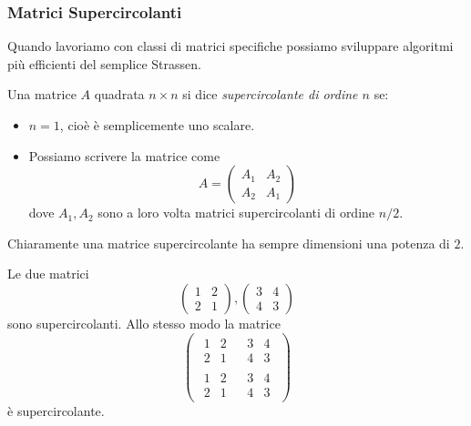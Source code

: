 \documentclass[11pt]{scrartcl}
\begin{document}
	\newpage
	
	\subsubsection{Matrici Supercircolanti}
	Quando lavoriamo con classi di matrici specifiche possiamo sviluppare algoritmi più efficienti del semplice Strassen.
	\begin{definition}
		Una matrice $A$ quadrata $n\times n$ si dice \textit{supercircolante di ordine $n$} se:
		\begin{itemize}
			\item $n=1$, cioè è semplicemente uno scalare.
			\item Possiamo scrivere la matrice come
			$$A=\left(
			\begin{array}{c|c}
				A_1 & A_2 \\
				\hline
				A_2 & A_1
			\end{array}
			\right)$$
			dove $A_1,A_2$ sono a loro volta matrici supercircolanti di ordine $n/2$.
		\end{itemize}
		Chiaramente una matrice supercircolante ha sempre dimensioni una potenza di $2$.
	\end{definition}
	\begin{example}
		Le due matrici 
		$$
		\left(
		\begin{array}{c|c}
			1 & 2 \\
			\hline
			2 & 1
		\end{array}
		\right),
		\left(
		\begin{array}{c|c}
			3 & 4 \\
			\hline
			4 & 3
		\end{array}		
		\right)
		$$
		sono supercircolanti. Allo stesso modo la matrice
		$$
		\left(
		\begin{array}{c|c}
			\begin{array}{c|c}
				1 & 2 \\
				\hline
				2 & 1
			\end{array} & 
			\begin{array}{c|c}
			3 & 4 \\
			\hline
			4 & 3
			\end{array}	\\
			\hline
			\begin{array}{c|c}
				1 & 2 \\
				\hline
				2 & 1
			\end{array} &
			\begin{array}{c|c}
				3 & 4 \\
				\hline
				4 & 3
			\end{array}
		\end{array}
		\right)
		$$
		è supercircolante. 
	\end{example}
\end{document}
